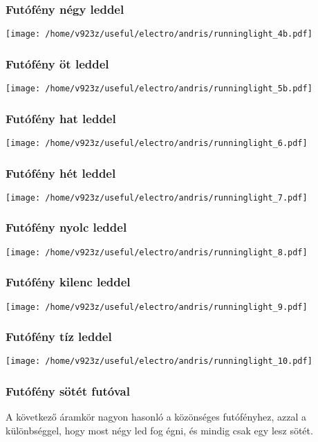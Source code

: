 \documentclass[16pt]{scrreprt}
\begin{document}
\subsubsection{Futófény négy leddel}
\texttt{[image: /home/v923z/useful/electro/andris/runninglight\_4b.pdf]}

\subsubsection{Futófény öt leddel}
\texttt{[image: /home/v923z/useful/electro/andris/runninglight\_5b.pdf]}

\subsubsection{Futófény hat leddel}
\texttt{[image: /home/v923z/useful/electro/andris/runninglight\_6.pdf]}

\subsubsection{Futófény hét leddel}
\texttt{[image: /home/v923z/useful/electro/andris/runninglight\_7.pdf]}

\subsubsection{Futófény nyolc leddel}
\texttt{[image: /home/v923z/useful/electro/andris/runninglight\_8.pdf]}

\subsubsection{Futófény kilenc leddel}
\texttt{[image: /home/v923z/useful/electro/andris/runninglight\_9.pdf]}

\subsubsection{Futófény tíz leddel}
\texttt{[image: /home/v923z/useful/electro/andris/runninglight\_10.pdf]}

\subsubsection{Futófény sötét futóval}
A következő áramkör nagyon hasonló a közönséges futófényhez, azzal a különbséggel, hogy most négy led fog égni, és
mindig csak egy lesz sötét. 
\end{document}
